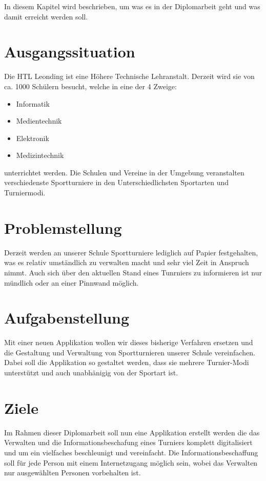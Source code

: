 In diesem Kapitel wird beschrieben, um was es in der Diplomarbeit geht und was damit erreicht werden soll.

\section{Ausgangssituation}
Die HTL Leonding ist eine Höhere Technische Lehranstalt. 
Derzeit wird sie von ca. 1000 Schülern besucht, welche in eine der 4 Zweige:
\begin{itemize}
\item Informatik
\item Medientechnik
\item Elektronik
\item Medizintechnik
\end{itemize}

unterrichtet werden. Die Schulen und Vereine in der Umgebung veranstalten 
verschiedenste Sportturniere in den Unterschiedlichsten Sportarten und Turniermodi.

\section{Problemstellung}

 Derzeit werden an unserer Schule Sportturniere lediglich auf Papier festgehalten, 
 was es relativ umständlich zu verwalten macht und sehr viel Zeit in Anspruch nimmt. 
 Auch sich über den aktuellen Stand eines Tunrniers zu informieren ist nur mündlich oder an einer Pinnwand möglich.

\section{Aufgabenstellung}
Mit einer neuen Applikation wollen wir dieses bisherige Verfahren ersetzen und die Gestaltung 
und Verwaltung von Sportturnieren unserer Schule vereinfachen. Dabei soll die Applikation so gestaltet werden, 
dass sie mehrere Turnier-Modi unterstützt und auch unabhänigig von der Sportart ist.

\section{Ziele}
Im Rahmen dieser Diplomarbeit soll nun eine Applikation erstellt werden die das Verwalten und die 
Informationsbeschafung eines Turniers komplett digitalisiert und um ein vielfaches beschleunigt und vereinfacht. 
Die Informationsbeschaffung soll für jede Person mit einem Internetzugang möglich sein, 
wobei das Verwalten nur ausgewählten Personen vorbehalten ist.